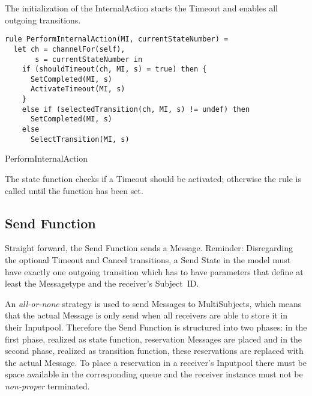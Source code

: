 The initialization of the InternalAction starts the Timeout and enables all outgoing transitions.


\begin{listing}[htbp]
\begin{verbatim}
rule PerformInternalAction(MI, currentStateNumber) =
  let ch = channelFor(self),
       s = currentStateNumber in
    if (shouldTimeout(ch, MI, s) = true) then {
      SetCompleted(MI, s)
      ActivateTimeout(MI, s)
    }
    else if (selectedTransition(ch, MI, s) != undef) then
      SetCompleted(MI, s)
    else
      SelectTransition(MI, s)
\end{verbatim}
\caption{PerformInternalAction}
\label{lst:shortasm:PerformInternalAction}
\end{listing}


The state function checks if a Timeout should be activated; otherwise the
 rule is called until the  function has
been set.



\subsection{Send Function}


Straight forward, the Send Function sends a Message. Reminder: Disregarding the optional Timeout and Cancel transitions, a Send State in the model must have exactly one outgoing transition which has to have parameters that define at least the Messagetype and the receiver's Subject~ID.

An \textit{all-or-none} strategy is used to send Messages to MultiSubjects, which means that the actual Message is only send when all receivers are able to store it in their Inputpool. Therefore the Send Function is structured into two phases: in the first phase, realized as state function, reservation Messages are placed and in the second phase, realized as transition function, these reservations are replaced with the actual Message. To place a reservation in a receiver's Inputpool there must be space available in the corresponding queue and the receiver instance must not be \textit{non-proper} terminated.


